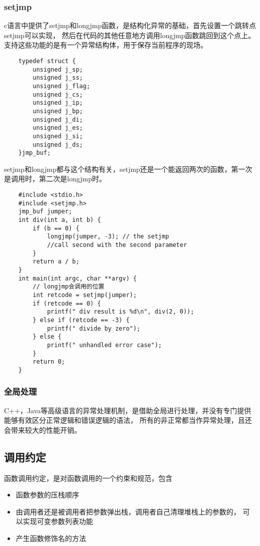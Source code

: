 \subsubsection{setjmp}
c语言中提供了setjmp和longjmp函数，是结构化异常的基础，首先设置一个跳转点setjmp可以实现，
然后在代码的其他任意地方调用longjmp函数跳回到这个点上。
\newline
支持这些功能的是有一个异常结构体，用于保存当前程序的现场。
\begin{lstlisting}
    typedef struct {
        unsigned j_sp;
        unsigned j_ss;
        unsigned j_flag;
        unsigned j_cs;
        unsigned j_ip;
        unsigned j_bp;
        unsigned j_di;
        unsigned j_es;
        unsigned j_si;
        unsigned j_ds;
    }jmp_buf;
\end{lstlisting}
setjmp和longjmp都与这个结构有关，setjmp还是一个能返回两次的函数，第一次是调用时，第二次是longjmp时。
\begin{lstlisting}
    #include <stdio.h>
    #include <setjmp.h>
    jmp_buf jumper;
    int div(int a, int b) {
        if (b == 0) {
            longjmp(jumper, -3); // the setjmp 
            //call second with the second parameter
        }
        return a / b;
    }
    int main(int argc, char **argv) {
        // longjmp会调用的位置
        int retcode = setjmp(jumper); 
        if (retcode == 0) {
            printf(" div result is %d\n", div(2, 0));
        } else if (retcode == -3) {
            printf(" divide by zero");
        } else {
            printf(" unhandled error case");
        }
        return 0;
    }
\end{lstlisting}

\subsubsection{全局处理}
C++，Java等高级语言的异常处理机制，是借助全局进行处理，并没有专门提供能够有效区分正常逻辑和错误逻辑的语法，
所有的非正常都当作异常处理，且还会带来较大的性能开销。

\subsection{调用约定}
函数调用约定，是对函数调用的一个约束和规范，包含
\begin{itemize}
    \item {函数参数的压栈顺序}
    \item {由调用者还是被调用者把参数弹出栈，调用者自己清理堆栈上的参数的，
    可以实现可变参数列表功能}
    \item {产生函数修饰名的方法}
\end{itemize}

